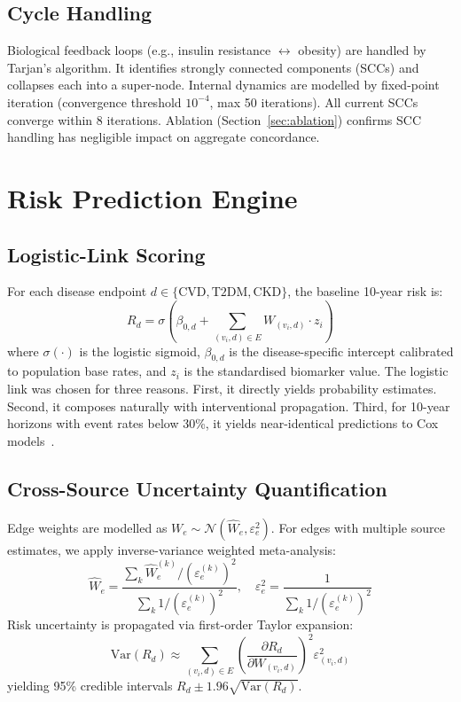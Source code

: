 \documentclass[runningheads]{llncs}
\begin{document}
\subsection{Cycle Handling}\label{sec:cycles}

Biological feedback loops (e.g., insulin resistance
$\leftrightarrow$ obesity) are handled by Tarjan's algorithm.
It identifies strongly connected components (SCCs) and collapses
each into a super-node.
Internal dynamics are modelled by fixed-point iteration
(convergence threshold $10^{-4}$, max 50 iterations).
All current SCCs converge within 8 iterations.
Ablation (Section~\ref{sec:ablation}) confirms SCC handling has
negligible impact on aggregate concordance.

\section{Risk Prediction Engine}\label{sec:risk}

\subsection{Logistic-Link Scoring}\label{sec:logistic}

For each disease endpoint $d \in \{\text{CVD}, \text{T2DM}, \text{CKD}\}$,
the baseline 10-year risk is:
\begin{equation}\label{eq:risk}
R_d = \sigma\!\left(\beta_{0,d} + \sum_{(v_i, d) \in E} W_{(v_i,d)} \cdot z_i\right)
\end{equation}
where $\sigma(\cdot)$ is the logistic sigmoid, $\beta_{0,d}$ is the
disease-specific intercept calibrated to population base rates, and
$z_i$ is the standardised biomarker value.
The logistic link was chosen for three reasons.
First, it directly yields probability estimates.
Second, it composes naturally with interventional propagation.
Third, for 10-year horizons with event rates below 30\%, it yields
near-identical predictions to Cox
models~\cite{dagostino2008}.

\subsection{Cross-Source Uncertainty Quantification}\label{sec:uncert}

Edge weights are modelled as $W_e \sim \mathcal{N}(\hat{W}_e,
\varepsilon_e^2)$.
For edges with multiple source estimates, we apply inverse-variance
weighted meta-analysis:
\begin{equation}\label{eq:meta}
\hat{W}_e = \frac{\sum_k \hat{W}_e^{(k)} / (\varepsilon_e^{(k)})^2}
{\sum_k 1 / (\varepsilon_e^{(k)})^2}, \quad
\varepsilon_e^2 = \frac{1}{\sum_k 1 / (\varepsilon_e^{(k)})^2}
\end{equation}
Risk uncertainty is propagated via first-order Taylor expansion:
\begin{equation}\label{eq:riskvar}
\mathrm{Var}(R_d) \approx \sum_{(v_i,d) \in E}
\left(\frac{\partial R_d}{\partial W_{(v_i,d)}}\right)^2 \varepsilon_{(v_i,d)}^2
\end{equation}
yielding 95\% credible intervals $R_d \pm 1.96\sqrt{\mathrm{Var}(R_d)}$.
\end{document}

